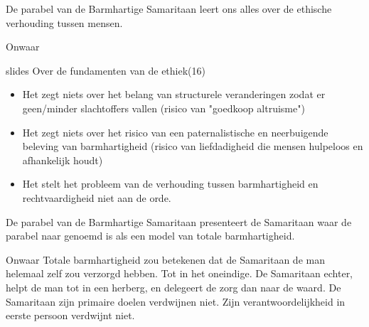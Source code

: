 \documentclass[main.tex]{subfiles}
\begin{document}
\begin{examenvraag}
    \begin{stelling}
        De parabel van de Barmhartige Samaritaan leert ons alles over de ethische verhouding tussen mensen.
    \end{stelling}


    \begin{stelling-antwoord}{Onwaar}
        \begin{citaat}{slides Over de fundamenten van de ethiek(16)}
            \begin{itemize}
                \item Het zegt niets over het belang van structurele veranderingen zodat er geen/minder slachtoffers vallen (risico van "goedkoop altruisme")
                \item Het zegt niets over het risico van een paternalistische en neerbuigende beleving van barmhartigheid (risico van liefdadigheid die mensen hulpeloos en afhankelijk houdt)
                \item Het stelt het probleem van de verhouding tussen barmhartigheid en rechtvaardigheid niet aan de orde.
            \end{itemize}
        \end{citaat}
    \end{stelling-antwoord}

\end{examenvraag}


\begin{examenvraag}
    \begin{stelling}
        De parabel van de Barmhartige Samaritaan presenteert de Samaritaan waar de parabel naar genoemd is als een model van totale barmhartigheid.
    \end{stelling}

    \begin{stelling-antwoord}{Onwaar}
        Totale barmhartigheid zou betekenen dat de Samaritaan de man helemaal zelf zou verzorgd hebben.
        Tot in het oneindige.
        De Samaritaan echter, helpt de man tot in een herberg, en delegeert de zorg dan naar de waard.
        De Samaritaan zijn primaire doelen verdwijnen niet.
        Zijn verantwoordelijkheid in eerste persoon verdwijnt niet.
    \end{stelling-antwoord}
\end{examenvraag}
\end{document}
